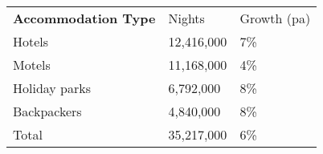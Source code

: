 \begin{tabular}[t]{p{4.5cm}>{\hfill}p{1.3cm}>{\hfill}p{1.7cm}}
 \textbf{Accommodation Type} & Nights & Growth (pa) \\ 
 Hotels & 12,416,000 & 7\% \\ 
  Motels & 11,168,000 & 4\% \\ 
  Holiday parks &  6,792,000 & 8\% \\ 
  Backpackers &  4,840,000 & 8\% \\ 
  Total & 35,217,000 & 6\% \\ 
  \end{tabular}
